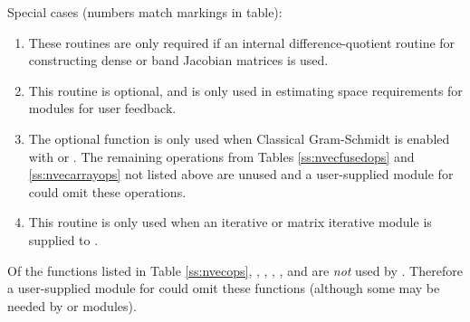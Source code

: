 Special cases (numbers match markings in table):
\begin{enumerate}
\item These routines are only required if an internal
  difference-quotient routine for constructing dense or band
  Jacobian matrices is used.
\item This routine is optional, and is only used in estimating
  space requirements for {\idas} modules for user feedback.
\item The optional function  is only used
  when Classical Gram-Schmidt is enabled with {\spgmr} or
  {\spfgmr}. The remaining operations from Tables \ref{ss:nvecfusedops}
  and \ref{ss:nvecarrayops} not listed above are unused and a
  user-supplied {\nvector} module for {\idas} could omit these
  operations.
\item This routine is only used when an iterative or matrix iterative
  {\sunlinsol} module is supplied to {\idas}.
\end{enumerate}

Of the functions listed in Table \ref{ss:nvecops}, ,
, , , and
 are {\em not} used by
{\idas}. Therefore a user-supplied {\nvector} module for {\idas} could
omit these functions (although some may be needed by {\sunnonlinsol}
or {\sunlinsol} modules).


















